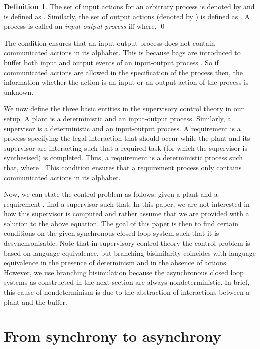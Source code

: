 \documentclass[copyright]{eptcs}
\theoremstyle{plain}
\theoremstyle{definition}
\newtheorem{definition}[theorem]{Definition}
\begin{document}
\begin{definition}
The set of input actions for an arbitrary process  is denoted by  and is defined as . Similarly, the set of output actions (denoted by ) is defined as . A process  is called an \emph{input-output process} iff 
where, \qed
\end{definition}

The condition  ensures that an input-output process does not contain communicated actions in its alphabet. This is because bags are introduced to buffer both input and output events of an input-output process . So if communicated actions are allowed in the specification of the process  then, the information whether the action  is an input or an output action of the process  is unknown.

We now define the three basic entities in the supervisory control theory in our setup. A plant  is a deterministic and an input-output process. Similarly, a supervisor is a deterministic and an input-output process. A requirement is a process specifying the legal interaction that should occur while the plant and its supervisor are interacting such that a required task (for which the supervisor is synthesised) is completed. Thus, a requirement is a deterministic process  such that, 
where . This condition ensures that a requirement process only contains communicated actions in its alphabet.

Now, we can state the control problem as follows: given a plant  and a requirement , find a supervisor  such that, 
In this paper, we are not interested in how this supervisor is computed and rather assume that we are provided with a solution to the above equation. The goal of this paper is then to find certain conditions on the given synchronous closed loop system such that it is desynchronisable. Note that in supervisory control theory the control problem is based on language equivalence, but branching bisimilarity coincides with language equivalence in the presence of determinism and in the absence of  actions. However, we use branching bisimulation because the asynchronous closed loop systems as constructed in the next section are always nondeterministic. In brief, this cause of nondeterminism is due to the abstraction of interactions between a plant and the buffer.

\section{From synchrony to asynchrony}\label{sec:synctoasync}
\end{document}

